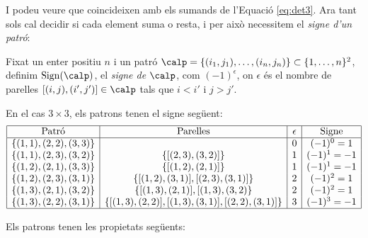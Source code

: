 I podeu veure que coincideixen amb els sumands de l'Equació \eqref{eq:det3}. Ara tant sols cal decidir si cada element suma o resta, i per això necessitem el \emph{signe d'un patró}:
\begin{definicio}\label{def:signepatro}
Fixat un enter positiu $n$ i un patró $\calp=\{(i_1,j_1),\dots,(i_n,j_n)\}\subset \{1,\dots,n\}^2$, definim $\sign(\calp)$, el \emph{signe de $\calp$}, com $(-1)^\epsilon$, on $\epsilon$ és el nombre de parelles $[(i,j),(i',j')]\in\calp$ tals que $i<i'$ i $j>j'$.
\end{definicio}
\begin{exemple}
    En el cas $3\times 3$, els patrons tenen el signe següent:
    $$
    \begin{array}{|c|c|c|c|}
    \hline \text{Patró} & \text{Parelles} & \epsilon & \text{Signe} \\ \hline
    \{(1,1),(2,2),(3,3)\} & & 0 & (-1)^0=1 \\
    \{(1,1),(2,3),(3,2)\} & \{[(2,3),(3,2)]\} & 1 & (-1)^1=-1 \\
    \{(1,2),(2,1),(3,3)\} & \{[(1,2),(2,1)]\} & 1 & (-1)^1=-1 \\
    \{(1,2),(2,3),(3,1)\} & \{[(1,2),(3,1)],[(2,3),(3,1)]\} & 2 & (-1)^2=1 \\
    \{(1,3),(2,1),(3,2)\} & \{[(1,3),(2,1)],[(1,3),(3,2)\} & 2 & (-1)^2=1 \\
    \{(1,3),(2,2),(3,1)\} & \{[(1,3),(2,2)],[(1,3),(3,1)],[(2,2),(3,1)]\} & 3 & (-1)^3=-1 \\ \hline
    \end{array}
    $$
\end{exemple}
Els patrons tenen les propietats següents:
